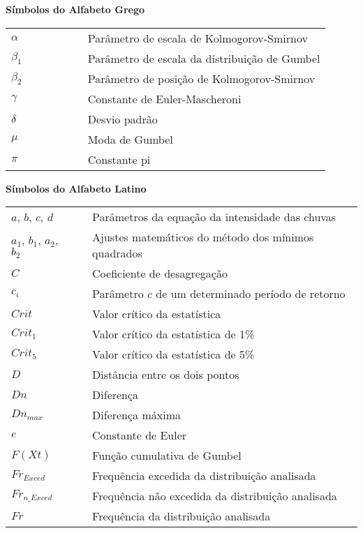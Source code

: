\noindent \textbf{Símbolos do Alfabeto Grego}

\begin{table}[h!]
	\flushleft
	\renewcommand{\arraystretch}{1.8}
	\begin{tabular}{lp{.3cm}l}
$ \alpha \quad\quad\quad\quad \  $ && Parâmetro de escala de Kolmogorov-Smirnov \\
$ \beta_{1} $ && Parâmetro de escala da distribuição de Gumbel \\
$ \beta_{2} $ && Parâmetro de posição de Kolmogorov-Smirnov \\
$ \gamma $ && Constante de Euler-Mascheroni \\
$ \delta $ && Desvio padrão \\
$ \mu $ && Moda de Gumbel \\
$ \pi $ && Constante pi \\
\end{tabular} 
\end{table}

\noindent \textbf{Símbolos do Alfabeto Latino}

\begin{table}[h!]
	\flushleft
	\renewcommand{\arraystretch}{1.8}
	\begin{tabular}{lp{.3cm}l}
$ a $, $ b $, $ c $, $ d $ && Parâmetros da equação da intensidade das chuvas \\
$ a_1 $, $ b_1 $, $ a_2 $, $ b_2 $ && Ajustes matemáticos do método dos mínimos quadrados \\
$ C $ && Coeficiente de desagregação \\
$ c_i $ && Parâmetro $c$ de um determinado período de retorno \\
$ Crit $ && Valor crítico da estatística \\
$ Crit_1 $ && Valor crítico da estatística de 1\% \\
$ Crit_5 $ && Valor crítico da estatística de 5\% \\
$ D $ && Distância entre os dois pontos \\
$ Dn $ && Diferença \\
$ Dn_{max} $ && Diferença máxima \\
$ e $ && Constante de Euler \\
$ F(Xt) $ && Função cumulativa de Gumbel \\
$ Fr_{Exced} $ && Frequência excedida da distribuição analisada \\
$ Fr_{n\_Exced} $ && Frequência não excedida da distribuição analisada \\
$ Fr $ && Frequência da distribuição analisada \\
\end{tabular} 
\end{table}

